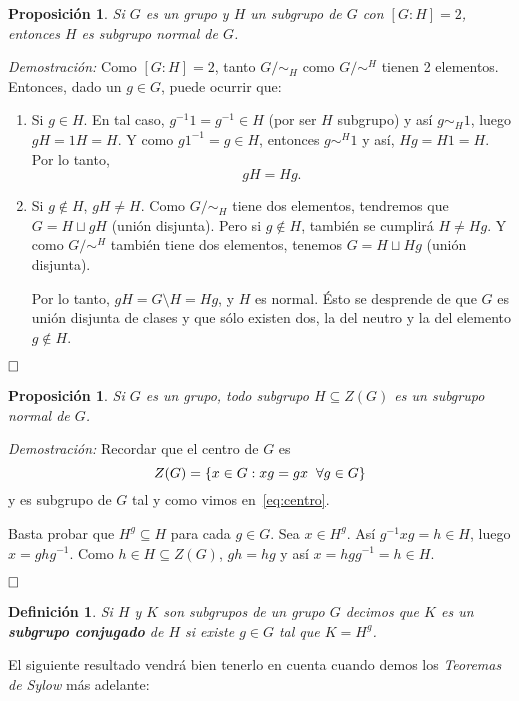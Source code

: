 \documentclass[12pt]{article}
\newtheorem{proposition}[theorem]{Proposición}
\newtheorem{definition}[theorem]{Definición}
\begin{document}
\begin{proposition}Si $G$ es un grupo y $H$ un subgrupo de $G$ con $\left[ G:H \right] = 2$, entonces $H$ es subgrupo normal de $G$.
\end{proposition}
\emph{Demostración: }Como $\left[ G:H \right] = 2$, tanto $G/\sim_{H}$ como $G/\sim^{H}$ tienen 2 elementos. Entonces, dado un $g \in G$, puede ocurrir que:\begin{enumerate}
\item Si $g \in H$. En tal caso, $g^{-1}1 = g^{-1} \in H$ (por ser $H$ subgrupo) y así $g\sim_{H}1$, luego $gH = 1H = H.$ Y como $g1^{-1} = g \in H$, entonces $g\sim^{H}1$ y así, $Hg = H1 = H.$ Por lo tanto, $$gH = Hg.$$
\item Si $g \notin H$, $gH \neq H$. Como $G/\sim_{H}$ tiene dos elementos, tendremos que $G = H\sqcup gH$ (unión disjunta).
Pero si $g\notin H$, también se cumplirá $H \neq Hg$. Y como $G/\sim^{H}$ también tiene dos elementos, tenemos $ G = H \sqcup Hg$ (unión disjunta).

Por lo tanto, $gH = G\setminus H = Hg$, y $H$ es normal. Ésto se desprende de que $G$ es unión disjunta de clases y que sólo existen dos, la del neutro y la del elemento $g \notin H$.
\end{enumerate}
$\hfill \square$

\begin{proposition}Si $G$ es un grupo, todo subgrupo $H \subseteq Z(G)$ es un subgrupo normal de $G$.
\end{proposition}
\emph{Demostración: } Recordar que el centro de $G$ es $$Z(G) = \lbrace x \in G : xg = gx \hspace{0.2cm} \forall g \in G\rbrace$$ y es subgrupo de $G$ tal y como vimos en~\ref{eq:centro}.

Basta probar que $H^{g}\subseteq H$ para cada $g \in G$. Sea $x \in H^{g}$. Así $g^{-1}xg = h \in H$, luego $x = ghg^{-1}$. Como $h \in H \subseteq Z(G)$, $gh = hg$ y así $x = hgg^{-1} = h \in H.$

$\hfill \square$

\begin{definition}Si $H$ y $K$ son subgrupos de un grupo $G$ decimos que $K$ es un \textbf{subgrupo conjugado} de $H$ si existe $g \in G$ tal que $K =H^{g}$.
\end{definition}

El siguiente resultado vendrá bien tenerlo en cuenta cuando demos los \textit{Teoremas de Sylow} más adelante: 
\end{document}

